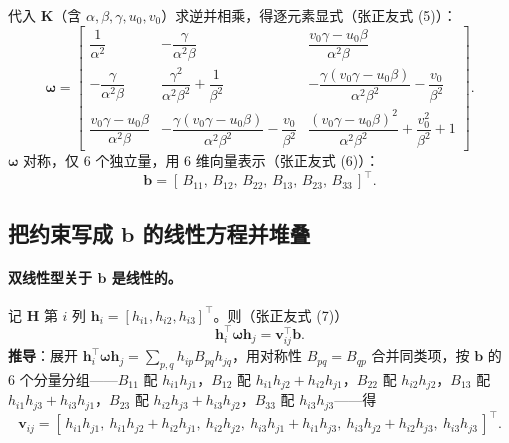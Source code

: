 代入 $\mathbf{K}$（含 $\alpha,\beta,\gamma,u_0,v_0$）求逆并相乘，得逐元素显式（张正友式 (5)\cite{zhang2000calibration}）：
\begin{equation}
  \boldsymbol{\omega}=\begin{bmatrix}
  \dfrac{1}{\alpha^2} & -\dfrac{\gamma}{\alpha^2\beta} & \dfrac{v_0\gamma-u_0\beta}{\alpha^2\beta}\\[2.2ex]
  -\dfrac{\gamma}{\alpha^2\beta} & \dfrac{\gamma^2}{\alpha^2\beta^2}+\dfrac{1}{\beta^2} & -\dfrac{\gamma(v_0\gamma-u_0\beta)}{\alpha^2\beta^2}-\dfrac{v_0}{\beta^2}\\[2.2ex]
  \dfrac{v_0\gamma-u_0\beta}{\alpha^2\beta} & -\dfrac{\gamma(v_0\gamma-u_0\beta)}{\alpha^2\beta^2}-\dfrac{v_0}{\beta^2} & \dfrac{(v_0\gamma-u_0\beta)^2}{\alpha^2\beta^2}+\dfrac{v_0^2}{\beta^2}+1
  \end{bmatrix}.
  \label{eq:calib-omega-elements}
\end{equation}
$\boldsymbol{\omega}$ 对称，仅 $6$ 个独立量，用 $6$ 维向量表示（张正友式 (6)\cite{zhang2000calibration}）：
\begin{equation}
  \mathbf{b}=[\,B_{11},\,B_{12},\,B_{22},\,B_{13},\,B_{23},\,B_{33}\,]^\top.
  \label{eq:calib-b}
\end{equation}

\subsection{把约束写成 \texorpdfstring{$\mathbf{b}$}{b} 的线性方程并堆叠}
\label{sec:calib-Vb}

\paragraph{双线性型关于 $\mathbf{b}$ 是线性的。}
记 $\mathbf{H}$ 第 $i$ 列 $\mathbf{h}_i=[h_{i1},h_{i2},h_{i3}]^\top$。则（张正友式 (7)\cite{zhang2000calibration}）
\begin{equation}
  \mathbf{h}_i^\top\boldsymbol{\omega}\mathbf{h}_j=\mathbf{v}_{ij}^\top\mathbf{b}.
  \label{eq:calib-vij-bilinear}
\end{equation}
\textbf{推导}：展开 $\mathbf{h}_i^\top\boldsymbol{\omega}\mathbf{h}_j=\sum_{p,q}h_{ip}B_{pq}h_{jq}$，用对称性 $B_{pq}=B_{qp}$ 合并同类项，按 $\mathbf{b}$ 的 $6$ 个分量分组——$B_{11}$ 配 $h_{i1}h_{j1}$，$B_{12}$ 配 $h_{i1}h_{j2}+h_{i2}h_{j1}$，$B_{22}$ 配 $h_{i2}h_{j2}$，$B_{13}$ 配 $h_{i1}h_{j3}+h_{i3}h_{j1}$，$B_{23}$ 配 $h_{i2}h_{j3}+h_{i3}h_{j2}$，$B_{33}$ 配 $h_{i3}h_{j3}$——得
\begin{equation}
  \mathbf{v}_{ij}=[\,h_{i1}h_{j1},\ h_{i1}h_{j2}+h_{i2}h_{j1},\ h_{i2}h_{j2},\ h_{i3}h_{j1}+h_{i1}h_{j3},\ h_{i3}h_{j2}+h_{i2}h_{j3},\ h_{i3}h_{j3}\,]^\top.
  \label{eq:calib-vij}
\end{equation}

